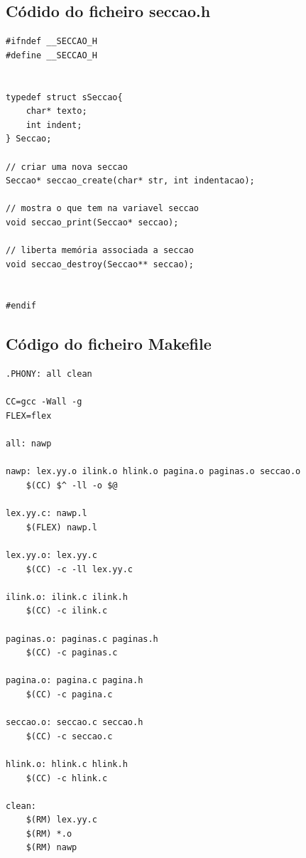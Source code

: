 \documentclass[11pt, a4paper, oneside]{article}
\begin{document}
\newpage
\subsection{Códido do ficheiro seccao.h}
\begin{verbatim}
#ifndef __SECCAO_H
#define __SECCAO_H


typedef struct sSeccao{
    char* texto;
    int indent;
} Seccao;

// criar uma nova seccao
Seccao* seccao_create(char* str, int indentacao);

// mostra o que tem na variavel seccao
void seccao_print(Seccao* seccao);

// liberta memória associada a seccao
void seccao_destroy(Seccao** seccao);


#endif

\end{verbatim}
\newpage

\subsection{Código do ficheiro Makefile}

\begin{verbatim}
.PHONY: all clean

CC=gcc -Wall -g
FLEX=flex

all: nawp

nawp: lex.yy.o ilink.o hlink.o pagina.o paginas.o seccao.o
	$(CC) $^ -ll -o $@

lex.yy.c: nawp.l
	$(FLEX) nawp.l

lex.yy.o: lex.yy.c 
	$(CC) -c -ll lex.yy.c

ilink.o: ilink.c ilink.h
	$(CC) -c ilink.c

paginas.o: paginas.c paginas.h
	$(CC) -c paginas.c

pagina.o: pagina.c pagina.h
	$(CC) -c pagina.c

seccao.o: seccao.c seccao.h
	$(CC) -c seccao.c

hlink.o: hlink.c hlink.h
	$(CC) -c hlink.c

clean:
	$(RM) lex.yy.c
	$(RM) *.o
	$(RM) nawp

\end{verbatim}
\newpage
\end{document}
